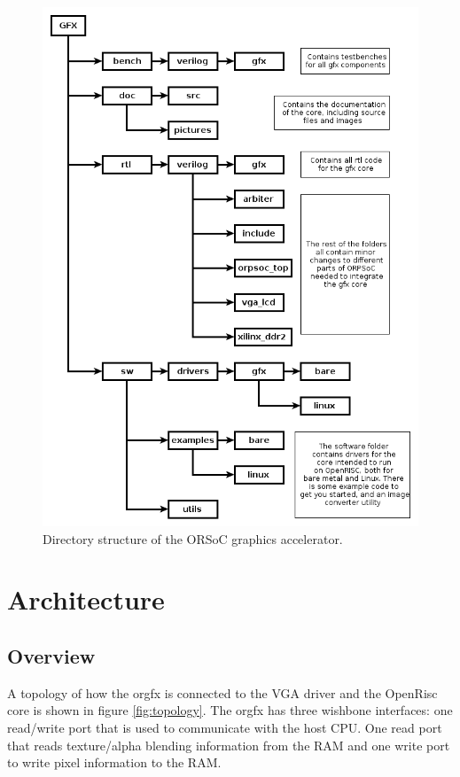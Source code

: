 \documentclass[10pt,a4paper]{article}
\begin{document}
\begin{figure}
\begin{center}
\includegraphics[scale=0.5]{../pictures/directory}
\caption{Directory structure of the ORSoC graphics accelerator.}
\label{fig:directory}
\end{center}
\end{figure}

\section{Architecture}
\subsection{Overview}
A topology of how the orgfx is connected to the VGA driver and the OpenRisc core is shown in figure \ref{fig:topology}. The orgfx has three wishbone interfaces: one read/write port that is used to communicate with the host CPU. One read port that reads texture/alpha blending information from the RAM and one write port to write pixel information to the RAM.
\end{document}
